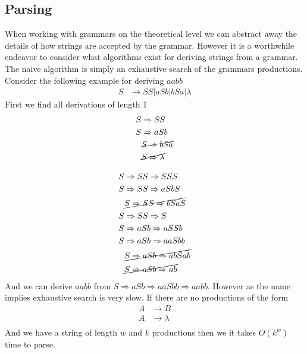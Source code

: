 \documentclass[11pt]{exam}
\begin{document}
\subsection{Parsing}

When working with grammars on the theoretical level we can abstract away the details of how strings are accepted by the grammar. However it is a worthwhile endeavor to consider what algorithms exist for deriving strings from a grammar.\\

The naive algorithm is simply an exhaustive search of the grammars productions. Consider the following example for deriving $aabb$
\begin{align*}
S &\rightarrow SS | aSb | bSa | \lambda
\end{align*}
First we find all derivations of length 1
\begin{align*}
S &\Rightarrow SS\\
S &\Rightarrow aSb\\
&\cancel{S \Rightarrow bSa}\\
&\cancel{S \Rightarrow \lambda}\\
\end{align*}

\begin{align*}
S &\Rightarrow SS \Rightarrow SSS\\
S &\Rightarrow SS \Rightarrow aSbS\\
&\cancel{S \Rightarrow SS \Rightarrow bSaS}\\
S &\Rightarrow SS \Rightarrow S\\
S &\Rightarrow aSb \Rightarrow aSSb\\
S &\Rightarrow aSb \Rightarrow aaSbb\\
&\cancel{S \Rightarrow aSb \Rightarrow abSab}\\
&\cancel{S \Rightarrow aSb \Rightarrow ab}\\
\end{align*}
And we can derive $aabb$ from $S \Rightarrow aSb \Rightarrow aaSbb \Rightarrow aabb$. However as the name implies exhaustive search is very slow. If there are no productions of the form 
\begin{align*}
A &\rightarrow B\\
A &\rightarrow \lambda\\
\end{align*}
And we have a string of length $w$ and $k$ productions then we it takes $O(k^w)$ time to parse.\\
\end{document}
